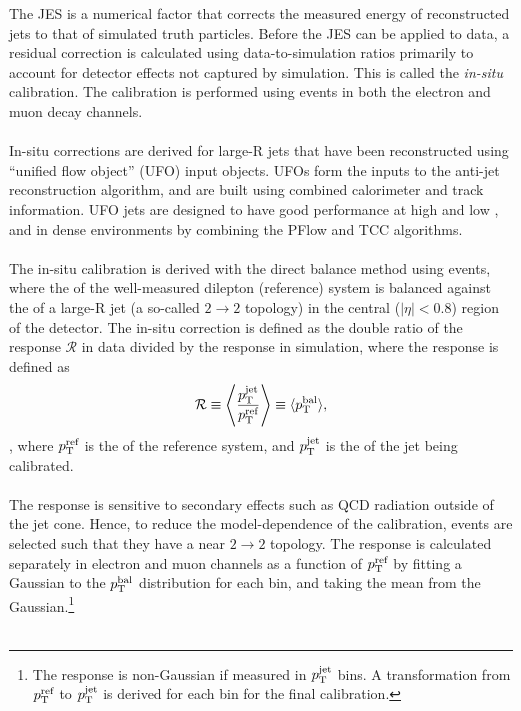 \documentclass{thesissummary}
\begin{document}
The JES is a numerical factor that corrects the measured energy of reconstructed jets to that of simulated truth particles. Before the JES can be applied to data, a residual correction is calculated using data-to-simulation ratios primarily to account for detector effects not captured by simulation. This is called the \textit{in-situ} calibration. The calibration is performed using \zjet events in both the electron and muon decay channels.
\\\\
In-situ corrections are derived for large-R jets that have been reconstructed using ``unified flow object'' (UFO) input objects. UFOs form the inputs to the anti-\kt jet reconstruction algorithm, and are built using combined calorimeter and track information. UFO jets are designed to have good performance at high and low \pt, and in dense environments by combining the PFlow \cite{pflow} and TCC \cite{tcc} algorithms.
\\\\
The in-situ calibration is derived with the direct balance method using \zjet events, where the \pt of the well-measured dilepton (reference) system is balanced against the \pt of a large-R jet (a so-called $2\rightarrow2$ topology) in the central ($|\eta|<0.8$) region of the detector. The in-situ correction is defined as the double ratio of the response $\mathcal{R}$ in data divided by the response in simulation, where the response is defined as 
\begin{equation}
    \mathcal{R} \equiv \Bigg\langle\frac{p_{\text{T}}^{\text{jet}}}{p_{\text{T}}^{\text{ref}}}\Bigg\rangle \equiv \langle p_{\text{T}}^{\text{bal}}\rangle,
\end{equation},
where $p_{\text{T}}^{\text{ref}}$ is the \pt of the reference system, and $p_{\text{T}}^{\text{jet}}$ is the \pt of the jet being calibrated.
\\\\
The response is sensitive to secondary effects such as QCD radiation outside of the jet cone. Hence, to reduce the model-dependence of the calibration, events are selected such that they have a near $2\rightarrow2$ topology. The response is calculated separately in electron and muon channels as a function of $p_{\text{T}}^{\text{ref}}$ by fitting a Gaussian to the $p_{\text{T}}^{\text{bal}}$ distribution for each bin, and taking the mean from the Gaussian.\footnote{The response is non-Gaussian if measured in $p_{\text{T}}^{\text{jet}}$ bins. A transformation from $p_{\text{T}}^{\text{ref}}$ to $p_{\text{T}}^{\text{jet}}$ is derived for each bin for the final calibration.}
\\\\
\end{document}
